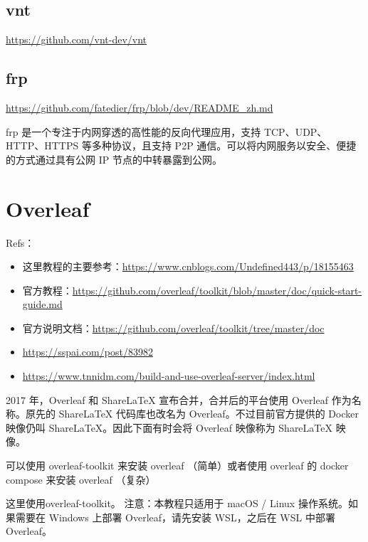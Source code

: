 \section{vnt}
\url{https://github.com/vnt-dev/vnt}



\section{frp}
\url{https://github.com/fatedier/frp/blob/dev/README_zh.md}

frp 是一个专注于内网穿透的高性能的反向代理应用，支持 TCP、UDP、HTTP、HTTPS 等多种协议，且支持 P2P 通信。可以将内网服务以安全、便捷的方式通过具有公网 IP 节点的中转暴露到公网。








\chapter{Overleaf}
Refs：
\begin{itemize}
\item 这里教程的主要参考：\url{https://www.cnblogs.com/Undefined443/p/18155463}

\item 官方教程：\url{https://github.com/overleaf/toolkit/blob/master/doc/quick-start-guide.md}

\item 官方说明文档：\url{https://github.com/overleaf/toolkit/tree/master/doc}

\item \url{https://sspai.com/post/83982}

\item \url{https://www.tnnidm.com/build-and-use-overleaf-server/index.html}
\end{itemize}

2017 年，Overleaf 和 ShareLaTeX 宣布合并，合并后的平台使用 Overleaf 作为名称。原先的 ShareLaTeX 代码库也改名为 Overleaf。不过目前官方提供的 Docker 映像仍叫 ShareLaTeX。因此下面有时会将 Overleaf 映像称为 ShareLaTeX 映像。

可以使用 overleaf-toolkit 来安装 overleaf （简单）或者使用 overleaf 的 docker compose 来安装 overleaf （复杂）

这里使用overleaf-toolkit。
注意：本教程只适用于 macOS / Linux 操作系统。如果需要在 Windows 上部署 Overleaf，请先安装 WSL，之后在 WSL 中部署 Overleaf。







